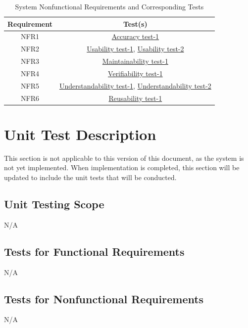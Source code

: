 \documentclass[12pt, titlepage]{article}
\begin{document}
\begin{table}[h!]
  \centering
    \begin{tabular}{|c|c|}
      \hline
      \textbf{Requirement} & \textbf{Test(s)} \\ \hline
      NFR1 & \textcolor{blue}{\hyperlink{Accuracy test-1}{Accuracy test-1}}  \\ \hline
      NFR2 & \textcolor{blue}{\hyperlink{Usability test-1}{Usability test-1}}, \textcolor{blue}{\hyperlink{Usability test-2}{Usability test-2}} \\ \hline
      NFR3 & \textcolor{blue}{\hyperlink{Maintainability test-1}{Maintainability test-1}}\\ \hline
      NFR4 & \textcolor{blue}{\hyperlink{Verifiability test-1}{Verifiability test-1}} \\ \hline
      NFR5 & \textcolor{blue}{\hyperlink{Understandability test-1}{Understandability test-1}}, \textcolor{blue}{\hyperlink{Understandability test-2}{Understandability test-2}} \\ \hline
      NFR6 & \textcolor{blue}{\hyperlink{Reusability test-1}{Reusability test-1}} \\ \hline
      \end{tabular}
      \caption{System Nonfunctional Requirements and Corresponding Tests}
      \label{tab:requirements_tests}
  \end{table}

\section{Unit Test Description}

This section is not applicable to this version of this document, as the system is not yet implemented.
When implementation is completed, this section will be updated to include the unit tests that will be conducted.

\subsection{Unit Testing Scope}
N/A

\subsection{Tests for Functional Requirements}
N/A

\subsection{Tests for Nonfunctional Requirements}
N/A
\end{document}
